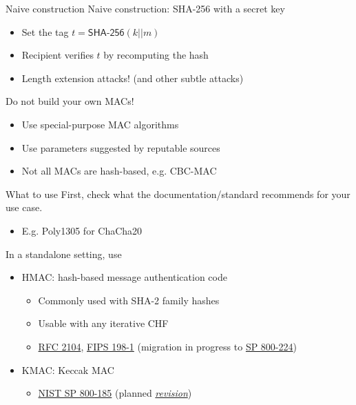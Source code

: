\begin{frame}{Naive construction}
  Naive construction: SHA-256 with a secret key
  \begin{itemize}[<+(1)->]
    \item Set the tag $t = \mathsf{SHA\text{-}256}(k||m)$
    \item Recipient verifies $t$ by recomputing the hash
    \item Length extension attacks! (and other subtle attacks)
  \end{itemize}

  \vspace*{1em}

  \pause
  Do not build your own MACs!
  \begin{itemize}[<+(1)->]
    \item Use special-purpose MAC algorithms
    \item Use parameters suggested by reputable sources
    \item Not all MACs are hash-based, e.g. CBC-MAC
  \end{itemize}
\end{frame}

\begin{frame}{What to use}
  First, check what the documentation/standard recommends for your use case.
  \begin{itemize}
    \item E.g. Poly1305 for ChaCha20
  \end{itemize}

  \vspace*{1em}

  \pause
  In a standalone setting, use
  \begin{itemize}[<+(1)->]
    \item HMAC: hash-based message authentication code
    \begin{itemize}
      \item Commonly used with SHA-2 family hashes
      \item Usable with any iterative CHF
      \item \href{https://datatracker.ietf.org/doc/html/rfc2104}{RFC 2104}, \href{https://csrc.nist.gov/pubs/fips/198-1/final}{FIPS 198-1} (migration in progress to \href{https://csrc.nist.gov/pubs/sp/800/224/ipd}{SP 800-224})
    \end{itemize}
    \item KMAC: Keccak MAC
    \begin{itemize}
      \item \href{https://csrc.nist.gov/pubs/sp/800/185/final}{NIST SP 800-185} (planned \href{https://csrc.nist.gov/news/2025/decision-to-update-fips-202-and-revise-sp-800-185}{\textit{revision}})
    \end{itemize}
  \end{itemize}
\end{frame}

